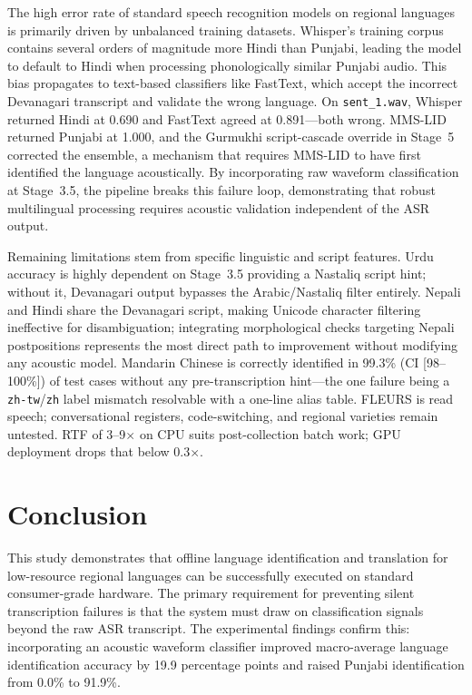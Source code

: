 \documentclass[conference]{IEEEtran}
\begin{document}
The high error rate of standard speech recognition models on regional languages is primarily driven by unbalanced training datasets. Whisper's training corpus contains several orders of magnitude more Hindi than Punjabi, leading the model to default to Hindi when processing phonologically similar Punjabi audio. This bias propagates to text-based classifiers like FastText, which accept the incorrect Devanagari transcript and validate the wrong language. On \texttt{sent\_1.wav}, Whisper returned Hindi at 0.690 and FastText agreed at 0.891---both wrong. MMS-LID returned Punjabi at 1.000, and the Gurmukhi script-cascade override in Stage~5 corrected the ensemble, a mechanism that requires MMS-LID to have first identified the language acoustically. By incorporating raw waveform classification at Stage~3.5, the pipeline breaks this failure loop, demonstrating that robust multilingual processing requires acoustic validation independent of the ASR output.

Remaining limitations stem from specific linguistic and script features. Urdu accuracy is highly dependent on Stage~3.5 providing a Nastaliq script hint; without it, Devanagari output bypasses the Arabic/Nastaliq filter entirely. Nepali and Hindi share the Devanagari script, making Unicode character filtering ineffective for disambiguation; integrating morphological checks targeting Nepali postpositions represents the most direct path to improvement without modifying any acoustic model. Mandarin Chinese is correctly identified in 99.3\% (CI [98--100\%]) of test cases without any pre-transcription hint---the one failure being a \texttt{zh-tw}/\texttt{zh} label mismatch resolvable with a one-line alias table. FLEURS is read speech; conversational registers, code-switching, and regional varieties remain untested. RTF of 3--9$\times$ on CPU suits post-collection batch work; GPU deployment drops that below 0.3$\times$.

\section{Conclusion}

This study demonstrates that offline language identification and translation for low-resource regional languages can be successfully executed on standard consumer-grade hardware. The primary requirement for preventing silent transcription failures is that the system must draw on classification signals beyond the raw ASR transcript. The experimental findings confirm this: incorporating an acoustic waveform classifier improved macro-average language identification accuracy by 19.9 percentage points and raised Punjabi identification from 0.0\% to 91.9\%.
\end{document}
